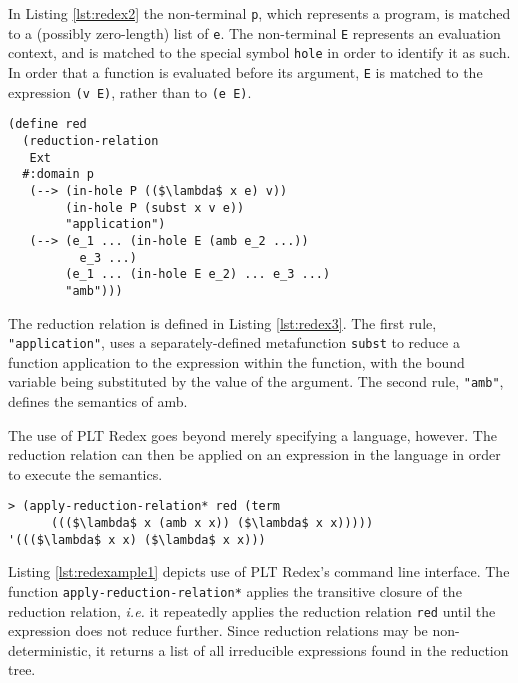 \documentclass[12pt,a4paper,twoside,openright]{report}
\begin{document}
In Listing \ref{lst:redex2} the non-terminal \texttt{p}, which represents a program, is matched to a (possibly zero-length) list of \texttt{e}. The non-terminal \texttt{E} represents an evaluation context, and is matched to the special symbol \texttt{hole} in order to identify it as such. In order that a function is evaluated before its argument, \texttt{E} is matched to the expression \texttt{(v E)}, rather than to \texttt{(e E)}.

\begin{minipage}{\linewidth} \begin{lstlisting}[caption=Defining a reduction relation in PLT Redex,label={lst:redex3}]
(define red
  (reduction-relation
   Ext
  #:domain p
   (--> (in-hole P (($\lambda$ x e) v))
        (in-hole P (subst x v e))
        "application")
   (--> (e_1 ... (in-hole E (amb e_2 ...)) 
          e_3 ...)
        (e_1 ... (in-hole E e_2) ... e_3 ...)
        "amb")))
\end{lstlisting} \end{minipage}

The reduction relation is defined in Listing \ref{lst:redex3}. The first rule, \texttt{"application"}, uses a separately-defined metafunction \texttt{subst} to reduce a function application to the expression within the function, with the bound variable being substituted by the value of the argument. The second rule, \texttt{"amb"}, defines the semantics of amb.

The use of PLT Redex goes beyond merely specifying a language, however. The reduction relation can then be applied on an expression in the language in order to execute the semantics.

\begin{minipage}{\linewidth} \begin{lstlisting}[caption=Applying the reduction relation with transitive closure,label={lst:redexample1}]
> (apply-reduction-relation* red (term
      ((($\lambda$ x (amb x x)) ($\lambda$ x x)))))
'((($\lambda$ x x) ($\lambda$ x x)))
\end{lstlisting} \end{minipage}

Listing \ref{lst:redexample1} depicts use of PLT Redex's command line interface. The function \texttt{apply-reduction-relation*} applies the transitive closure of the reduction relation, \textit{i.e.} it repeatedly applies the reduction relation \texttt{red} until the expression does not reduce further. Since reduction relations may be non-deterministic, it returns a list of all irreducible expressions found in the reduction tree.
\end{document}
